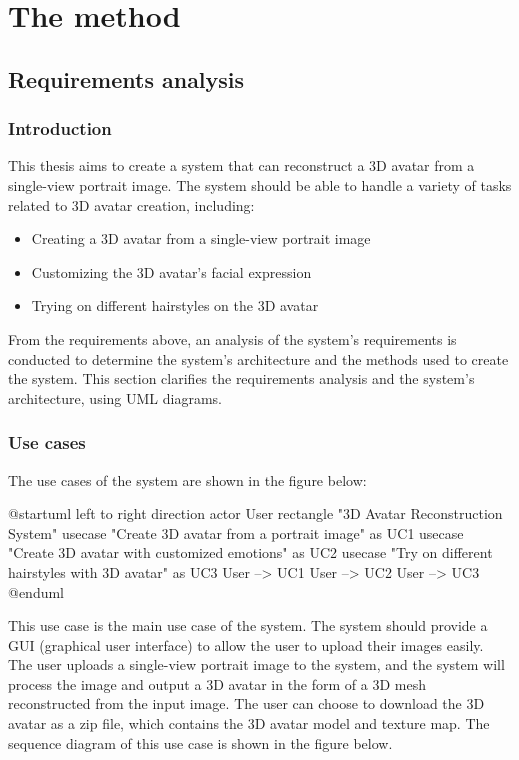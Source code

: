 \section{The method}
\label{sec:method}

\subsection{Requirements analysis}
\subsubsection{Introduction}
This thesis aims to create a system that can reconstruct a 3D avatar from a single-view portrait image. The system should be able to handle a variety of tasks related to 3D avatar creation, including:
\begin{itemize}
    \item Creating a 3D avatar from a single-view portrait image

    \item Customizing the 3D avatar's facial expression

    \item Trying on different hairstyles on the 3D avatar
\end{itemize}

From the requirements above, an analysis of the system's requirements is conducted to determine the system's architecture and the methods used to create the system. This section clarifies the requirements analysis and the system's architecture, using UML diagrams.

\subsubsection{Use cases}
The use cases of the system are shown in the figure below:
\clearpage

\begin{umlfigure}
    @startuml
    left to right direction
    actor User
    rectangle "3D Avatar Reconstruction System" {
    usecase "Create 3D avatar from a portrait image" as UC1
    usecase "Create 3D avatar with customized emotions" as UC2
    usecase "Try on different hairstyles with 3D avatar" as UC3
    }
    User --> UC1
    User --> UC2
    User --> UC3
    @enduml
\end{umlfigure}

This use case is the main use case of the system. The system should provide a GUI (graphical user interface) to allow the user to upload their images easily. The user uploads a single-view portrait image to the system, and the system will process the image and output a 3D avatar in the form of a 3D mesh reconstructed from the input image. The user can choose to download the 3D avatar as a zip file, which contains the 3D avatar model and texture map. The sequence diagram of this use case is shown in the figure below.

